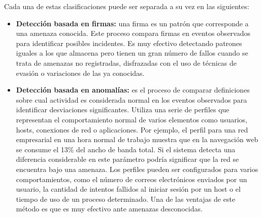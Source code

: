 Cada una de estas clasificaciones puede ser separada a su vez en las siguientes:

\begin{itemize}
    \item \textbf{Detección basada en firmas:} una firma es un patrón que corresponde a una amenaza conocida. Este proceso compara firmas en eventos observados para identificar posibles incidentes. Es muy efectivo detectando patrones iguales a los que almacena pero tienen un gran número de fallos cuando se trata de amenazas no registradas, disfrazadas con el uso de técnicas de evasión o variaciones de las ya conocidas.
    \item \textbf{Detección basada en anomalías:} es el proceso de comparar definiciones sobre cual actividad es considerada normal en los eventos observados para identificar desviaciones significantes. Utiliza una serie de perfiles que representan el comportamiento normal de varios elementos como usuarios, hosts, conexiones de red o aplicaciones. Por ejemplo, el perfil para una red empresarial en una hora normal de trabajo muestra que en la navegación web se consume el 13\% del ancho de banda total. Si el sistema detecta una diferencia considerable en este parámetro podría significar que la red se encuentra bajo una amenaza. Los perfiles pueden ser configurados para varios comportamientos, como el número de correos electrónicos enviados por un usuario, la cantidad de intentos fallidos al iniciar sesión por un host o el tiempo de uso de un proceso determinado. Una de las ventajas de este método es que es muy efectivo ante amenazas desconocidas.

\end{itemize}
